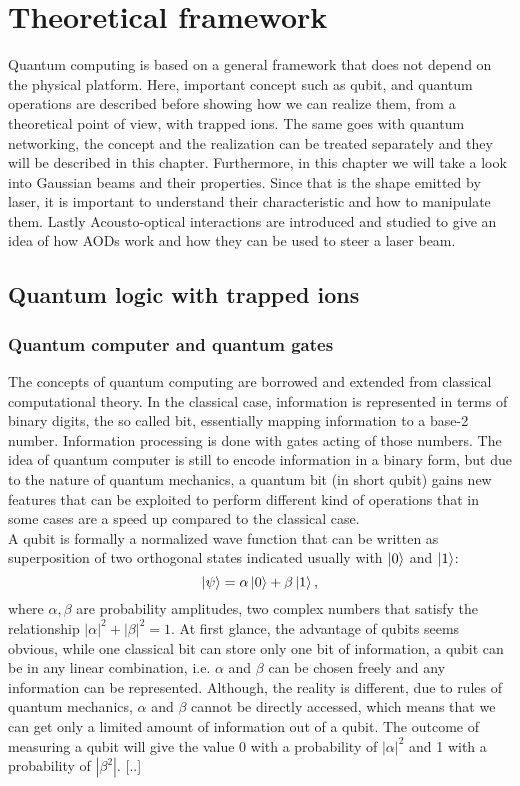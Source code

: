 
\chapter{Theoretical framework}
Quantum computing is based on a general framework that does not depend on the physical platform. Here, important concept such as qubit, and quantum operations are described before showing how we can realize them, from a theoretical point of view, with trapped ions. The same goes with quantum networking, the concept and the realization can be treated separately and they will be described in this chapter. Furthermore, in this chapter we will take a look into Gaussian beams and their properties. Since that is the shape emitted by laser, it is important to understand their characteristic and how to manipulate them. Lastly Acousto-optical interactions are introduced and studied to give an idea of how AODs work and how they can be used to steer a laser beam.
\section{Quantum logic with trapped ions}
\subsection{Quantum computer and quantum gates}
The concepts of quantum computing are borrowed and extended from classical computational theory. In the classical case, information is represented in terms of binary digits, the so called bit, essentially mapping information to a base-2 number. Information processing is done with gates acting of those numbers. The idea of quantum computer is still to encode information in a binary form, but due to the nature of quantum mechanics, a quantum bit (in short qubit) gains new features that can be exploited to perform different kind of operations that in some cases are a speed up compared to the classical case.\\
A qubit is formally a normalized wave function that can be written as superposition of two orthogonal states indicated usually with $\ket{0}$ and $\ket{1}$:
\begin{equation}
\label{qubit}
\ket{\psi} = \alpha \ket{0} + \beta\ket{1},
\end{equation}
where $\alpha,\beta$ are probability amplitudes, two complex numbers that satisfy the relationship $|\alpha|^2+|\beta|^2 = 1$.
At first glance, the advantage of qubits seems obvious, while one classical bit can store only one bit of information, a qubit can be in any linear combination, i.e. $\alpha$ and $\beta$ can be chosen freely and any information can be represented. Although, the reality is different, due to rules of quantum mechanics, $\alpha$ and $\beta$ cannot be directly accessed, which means that we can get only a limited amount of information out of a qubit. The outcome of measuring a qubit will give the value 0 with a probability of $|\alpha|^2$ and 1 with a probability of $|\beta^2|$.  [..]

